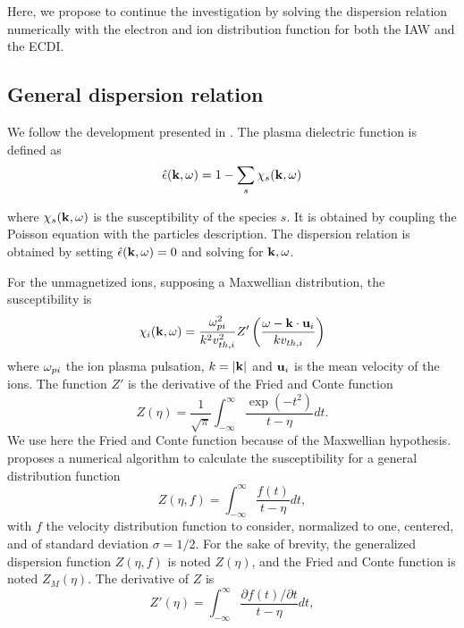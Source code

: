   Here, we propose to continue the investigation by solving the dispersion relation numerically with the electron and ion distribution function for both the \ac{IAW} and the \ac{ECDI}.
  
  
  \subsection{General dispersion relation}
    \label{sec-geneDR}
    
    We follow the development presented in \citet{ducrocq2006,cavalier2013,lafleur2016}.
    The plasma dielectric function is defined as
    \begin{equation} \label{eq-de}
      \hat\epsilon({\mathbf k},\omega) = 1 - \sum_s \chi_s({\mathbf k},\omega)
    \end{equation}
    
    where $\chi_s({\mathbf k}, \omega)$ is the susceptibility of the species $s$.
    It is obtained by coupling the Poisson equation with the particles description.
    The dispersion relation is obtained by setting $  \hat\epsilon({\mathbf k},\omega) =0$ and solving for ${\mathbf k},\omega$.
    
    
    For the unmagnetized ions, supposing a Maxwellian distribution, the susceptibility is
    \begin{equation} \label{eq-susceptibility}
      \chi_i({\mathbf k},\omega) = \frac{\omega_{pi}^2}{k^2 v^2_{th, i}} Z'\left( \frac{\omega - {\mathbf k} \cdot {\mathbf u_{i}}}{k v_{th, i}}  \right)
    \end{equation}
    where $\omega_{pi}$ the ion plasma pulsation, $k=\lvert{\mathbf k}\rvert$ and ${\mathbf u_i}$ is the mean velocity of the ions.
    The function $Z'$ is the derivative of the Fried and Conte function \citep{fried1961}
    \begin{equation} \label{eq-friedandConte}
      Z(\eta) = \frac{1}{\sqrt{\pi}} \int_{-\infty}^{\infty} \frac{\exp{(-t^2)}}{t - \eta} dt.
    \end{equation}
    We use here the Fried and Conte function because of the Maxwellian hypothesis.
    \citet{xie2013} proposes a numerical algorithm to calculate the susceptibility for a general distribution function
    \begin{equation} \label{eq-general}
      Z(\eta, f) = \int_{-\infty}^{\infty} \frac{f(t)}{t - \eta} dt,
    \end{equation}
    with $f$ the velocity distribution function to consider, normalized to one, centered, and of standard deviation $\sigma = 1/2$.
    For the sake of brevity, the generalized dispersion function $Z(\eta,f)$ is noted $Z(\eta)$, and the Fried and Conte function is noted $Z_M(\eta)$.
    The derivative of $Z$ is
    \begin{equation} \label{eq-derivatives}
      Z'(\eta) = \int_{-\infty}^{\infty} \frac{\partial f(t) / \partial t}{t - \eta} dt,
    \end{equation}
    
